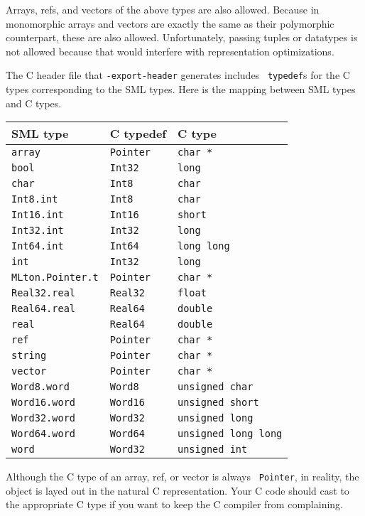 Arrays, refs, and vectors of the above types are also allowed.
Because in {\mlton} monomorphic arrays and vectors are exactly the
same as their polymorphic counterpart, these are also allowed.
Unfortunately, passing tuples or datatypes is not allowed because that
would interfere with representation optimizations.

The C header file that {\tt -export-header} generates includes {\tt
typedef}s for the C types corresponding to the SML types.  Here is the
mapping between SML types and C types.


\begin{center}
\begin{tabular}{l|l|l}
SML type & C typedef & C type\\
\hline
{\tt array} & {\tt Pointer} & {\tt char *} \\
{\tt bool} & {\tt Int32} & {\tt long} \\
{\tt char} & {\tt Int8} & {\tt char} \\
{\tt Int8.int} & {\tt Int8} & {\tt char} \\
{\tt Int16.int} & {\tt Int16} & {\tt short} \\
{\tt Int32.int} & {\tt Int32} & {\tt long} \\
{\tt Int64.int} & {\tt Int64} & {\tt long long} \\
{\tt int} & {\tt Int32} & {\tt long} \\
{\tt MLton.Pointer.t} & {\tt Pointer} & {\tt char *} \\
{\tt Real32.real} & {\tt Real32} & {\tt float} \\
{\tt Real64.real} & {\tt Real64} & {\tt double} \\
{\tt real} & {\tt Real64} & {\tt double} \\
{\tt ref} & {\tt Pointer} & {\tt char *} \\
{\tt string} & {\tt Pointer} & {\tt char *} \\
{\tt vector} & {\tt Pointer} & {\tt char *} \\
{\tt Word8.word} & {\tt Word8} & {\tt unsigned char} \\
{\tt Word16.word} & {\tt Word16} & {\tt unsigned short} \\
{\tt Word32.word} & {\tt Word32} & {\tt unsigned long} \\
{\tt Word64.word} & {\tt Word64} & {\tt unsigned long long} \\
{\tt word} & {\tt Word32} & {\tt unsigned int} \\
\end{tabular}
\end{center}

Although the C type of an array, ref, or vector is always {\tt
Pointer}, in reality, the object is layed out in the natural C
representation.  Your C code should cast to the appropriate C type if
you want to keep the C compiler from complaining.
